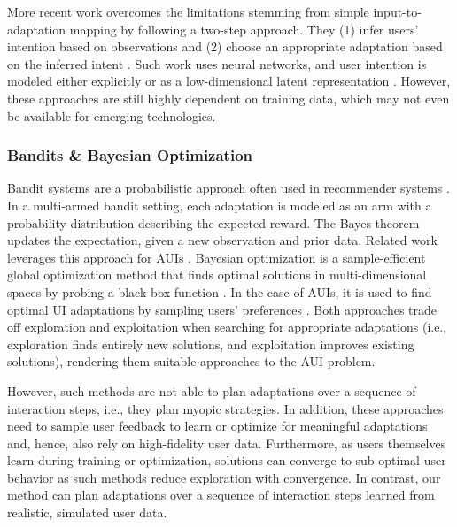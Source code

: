 More recent work overcomes the limitations stemming from simple input-to-adaptation mapping by following a two-step approach. They (1) infer users' intention based on observations and (2) choose an appropriate adaptation based on the inferred intent \cite{oulasvirta2018computational}.
Such work uses neural networks, and user intention is modeled either explicitly \cite{kolekar2010learning, soh2017deep} or as a low-dimensional latent representation \cite{RIZZOGLIO2021}.
However, these approaches are still highly dependent on  training data, which may not even be available for emerging technologies.  

\subsubsection{Bandits \& Bayesian Optimization} 
Bandit systems are a probabilistic approach often used in recommender systems \cite{glowacka2019bandit}.
In a multi-armed bandit setting, each adaptation is modeled as an arm with a probability distribution describing the expected reward.
The Bayes theorem updates the expectation, given a new observation and prior data.
Related work leverages this approach for AUIs \cite{lomas2016interface,koch2019may,kangas2022scalable}.
Bayesian optimization is a sample-efficient global optimization method that finds optimal solutions in multi-dimensional spaces by probing a black box function \cite{shahriari2015taking}. In the case of AUIs, it is used to find optimal UI adaptations by sampling users' preferences \cite{Koyama2014, Koyama2016}.
Both approaches trade off exploration and exploitation when searching for appropriate adaptations (i.e., exploration finds entirely new solutions, and exploitation improves existing solutions), rendering them suitable approaches to the AUI problem.

However, such methods are not able to plan adaptations over a sequence of interaction steps, i.e., they plan myopic strategies.
In addition, these approaches need to sample user feedback to learn or optimize for meaningful adaptations and, hence, also rely on high-fidelity user data.
Furthermore, as users themselves learn during training or optimization, solutions can converge to sub-optimal user behavior as such methods reduce exploration with convergence. 
In contrast, our method can plan adaptations over a sequence of interaction steps learned from realistic, simulated user data.  

